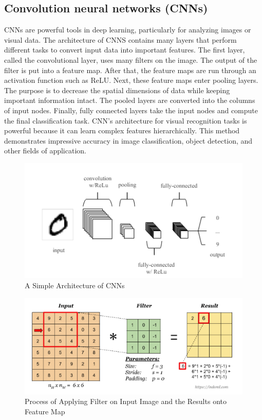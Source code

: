\documentclass[12pt]{article}
\begin{document}
\subsection{Convolution neural networks (CNNs)}
CNNs are powerful tools in deep learning, particularly for analyzing images or visual data. The architecture of CNNS contains many layers that perform different tasks to convert input data into important features. The first layer, called the convolutional layer, uses many filters on the image. The output of the filter is put into a feature map. After that, the feature maps are run through an activation function such as ReLU. Next, these feature maps enter pooling layers. The purpose is to decrease the spatial dimensions of data while keeping important information intact. The pooled layers are converted into the columns of input nodes. Finally, fully connected layers take the input nodes and compute the final classification task. CNN's architecture for visual recognition tasks is powerful because it can learn complex features hierarchically. This method demonstrates impressive accuracy in image classification, object detection, and other fields of application.
\begin{figure}[H]
    \centering
    \includegraphics[width=1\linewidth]{CNN.png}
    \caption{A Simple Architecture of CNNs~\cite{o2015introduction}}
    \label{fig:enter-label}
\end{figure}
\begin{figure}[H]
    \centering
    \includegraphics[width=1\linewidth]{Feature Map.png}
    \caption{Process of Applying Filter on Input Image and the Results onto Feature Map\cite{tammina2019transfer}}
    \label{fig:feature map}
\end{figure}
\end{document}
